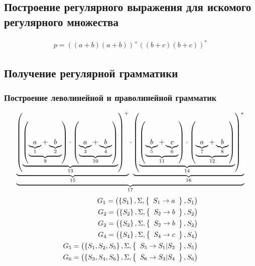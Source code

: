 \subsection{Построение регулярного выражения для искомого регулярного множества}
\begin{align}
	p=((a+b)(a+b))^+((b+c)(b+c))^*
\end{align}
\subsection{Получение регулярной грамматики}
\subsubsection{Построение леволинейной и праволинейной грамматик}
\begin{align}
	\ub{\ub{\rbr{\ub{
					\rbr{\ub{%
							\ub{a}_{1} + \ub{b}_{2}%
						}_{9}}
					\cdot
					\rbr{\ub{%
							\ub{a}_{3} + \ub{b}_{4}%
						}_{10}}}_{13}}^+}_{15}
		\cdot
		\ub{\rbr{\ub{\rbr{\ub{%
							\ub{b}_{5} + \ub{c}_{6}%
						}_{11}}
					\cdot
					\rbr{\ub{%
							\ub{a}_{7} + \ub{b}_{8}%
						}_{12}}}_{14}}^{*}}_{16}}_{17}
\end{align}
\begin{align*}
	G_1 = \left( \left\{S_1\right\}, \Sigma, \left\{\begin{array}{c} S_1 \to a \end{array}\right\}, S_1 \right)                      \\
	G_2 = \left( \left\{S_2\right\}, \Sigma, \left\{\begin{array}{c} S_2 \to b \end{array}\right\}, S_2 \right)                      \\
	G_2 = \left( \left\{S_2\right\}, \Sigma, \left\{\begin{array}{c} S_2 \to b \end{array}\right\}, S_2 \right)                      \\
	G_4 = \left( \left\{S_4\right\}, \Sigma, \left\{\begin{array}{c} S_4 \to c \end{array}\right\}, S_4 \right)                      \\
	G_5 = \left( \left\{S_1, S_2, S_5\right\}, \Sigma, \left\{\begin{array}{c} S_5 \to S_1\vert S_2 \end{array}\right\}, S_5 \right) \\
	G_6 = \left( \left\{S_3, S_4, S_6\right\}, \Sigma, \left\{\begin{array}{c} S_6 \to S_3\vert S_4 \end{array}\right\}, S_6 \right) \\
\end{align*}
